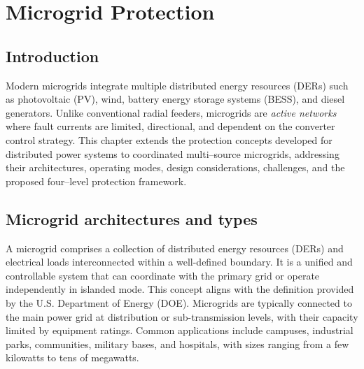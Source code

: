 \chapter{Microgrid Protection} 
\label{ch:microgrid_protection}
\section{Introduction}

Modern microgrids integrate multiple distributed energy resources (DERs) such as photovoltaic (PV), wind, battery energy storage systems (BESS), and diesel generators. 
Unlike conventional radial feeders, microgrids are \emph{active networks} where fault currents are limited, directional, and dependent on the converter control strategy. 
This chapter extends the protection concepts developed for distributed power systems to coordinated multi–source microgrids, addressing their architectures, operating modes, design considerations, challenges, and the proposed four–level protection framework.


\section{Microgrid architectures and types} 

A microgrid comprises a collection of distributed energy resources (DERs) and electrical loads interconnected within a well-defined boundary. It is a unified and controllable system that can coordinate with the primary grid or operate independently in islanded mode. This concept aligns with the definition provided by the U.S. Department of Energy (DOE).
Microgrids are typically connected to the main power grid at distribution or sub-transmission levels, with their capacity limited by equipment ratings. Common applications include campuses, industrial parks, communities, military bases, and hospitals, with sizes ranging from a few kilowatts to tens of megawatts.

